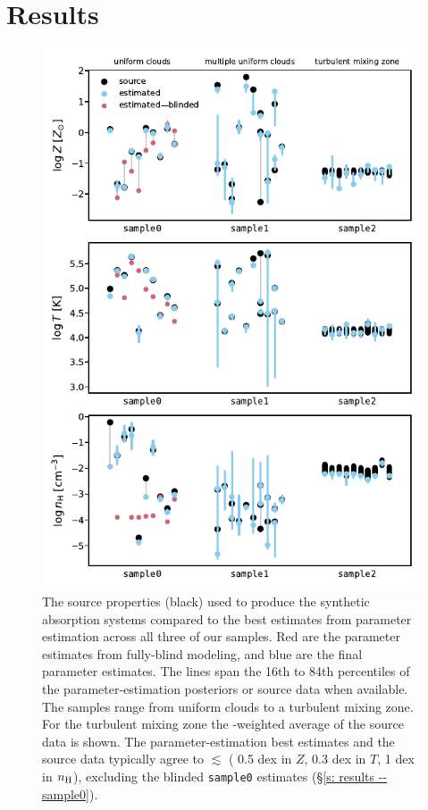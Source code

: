 \documentclass[fleqn,usenatbib]{mnras}
\begin{document}
\section{Results}
\label{s: results}

\begin{figure}
    \centering
    \includegraphics[width=\columnwidth]{figures/summary.pdf}
    \caption{
    The source properties (black) used to produce the synthetic absorption systems
    compared to the best estimates from parameter estimation across all three of our samples.
    Red are the parameter estimates from fully-blind modeling,
    and blue are the final parameter estimates.
    The lines span the 16th to 84th percentiles of the parameter-estimation posteriors or source data when available.
    The samples range from uniform clouds to a turbulent mixing zone.
    For the turbulent mixing zone the -weighted average of the source data is shown.
    The parameter-estimation best estimates and the source data typically agree to $\lesssim$ ( 0.5 dex in $Z$, 0.3 dex in $T$, 1 dex in $n_{\rm H}$),
    excluding the blinded \texttt{sample0} estimates (\S\ref{s: results -- sample0}).
    }
    \label{f: summary}
\end{figure}
\end{document}
